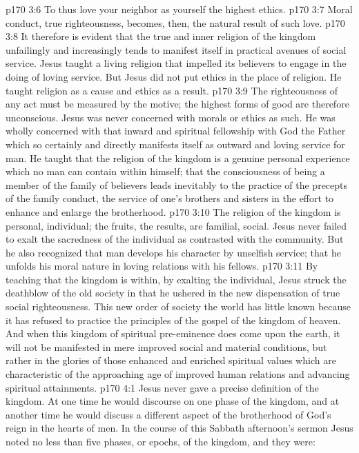 \vs p170 3:6 \bibnobreakspace To thus love your neighbor as yourself  the highest ethics.
\vs p170 3:7 \bibnobreakspace Moral conduct, true righteousness, becomes, then, the natural result of such love.
\vs p170 3:8 \pc It therefore is evident that the true and inner religion of the kingdom unfailingly and increasingly tends to manifest itself in practical avenues of social service. Jesus taught a living religion that impelled its believers to engage in the doing of loving service. But Jesus did not put ethics in the place of religion. He taught religion as a cause and ethics as a result.
\vs p170 3:9 The righteousness of any act must be measured by the motive; the highest forms of good are therefore unconscious. Jesus was never concerned with morals or ethics as such. He was wholly concerned with that inward and spiritual fellowship with God the Father which so certainly and directly manifests itself as outward and loving service for man. He taught that the religion of the kingdom is a genuine personal experience which no man can contain within himself; that the consciousness of being a member of the family of believers leads inevitably to the practice of the precepts of the family conduct, the service of one’s brothers and sisters in the effort to enhance and enlarge the brotherhood.
\vs p170 3:10 The religion of the kingdom is personal, individual; the fruits, the results, are familial, social. Jesus never failed to exalt the sacredness of the individual as contrasted with the community. But he also recognized that man develops his character by unselfish service; that he unfolds his moral nature in loving relations with his fellows.
\vs p170 3:11 By teaching that the kingdom is within, by exalting the individual, Jesus struck the deathblow of the old society in that he ushered in the new dispensation of true social righteousness. This new order of society the world has little known because it has refused to practice the principles of the gospel of the kingdom of heaven. And when this kingdom of spiritual pre\hyp{}eminence does come upon the earth, it will not be manifested in mere improved social and material conditions, but rather in the glories of those enhanced and enriched spiritual values which are characteristic of the approaching age of improved human relations and advancing spiritual attainments.
\vs p170 4:1 Jesus never gave a precise definition of the kingdom. At one time he would discourse on one phase of the kingdom, and at another time he would discuss a different aspect of the brotherhood of God’s reign in the hearts of men. In the course of this Sabbath afternoon’s sermon Jesus noted no less than five phases, or epochs, of the kingdom, and they were:
